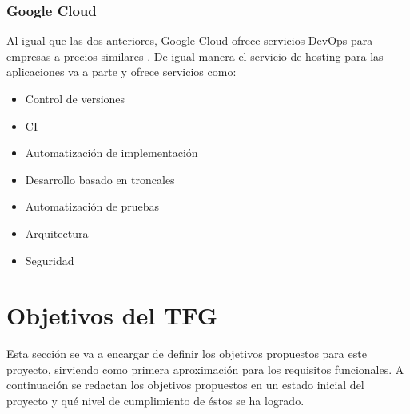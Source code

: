 		\subsubsection{Google Cloud}
			\begin{paragraph}
				Al igual que las dos anteriores, Google Cloud ofrece servicios DevOps para empresas a precios similares \cite{GoogleCloud:online}. De igual manera el servicio de hosting para las aplicaciones va a parte y ofrece servicios como:
				\begin{itemize}
					\item Control de versiones
					\item CI
					\item Automatización de implementación
					\item Desarrollo basado en troncales
					\item Automatización de pruebas
					\item Arquitectura
					\item Seguridad
				\end{itemize}
			\end{paragraph}	
	
\section{Objetivos del TFG}
	\begin{paragraph}
		Esta sección se va a encargar de definir los objetivos propuestos para este proyecto, sirviendo como primera aproximación para los requisitos funcionales. A continuación se redactan los objetivos propuestos en un estado inicial del proyecto y qué nivel de cumplimiento de éstos se ha logrado.
	\end{paragraph}
